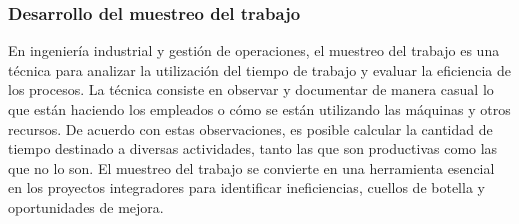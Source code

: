    \subsubsection{Desarrollo del muestreo del trabajo}
    En ingeniería industrial y gestión de operaciones, el muestreo del trabajo es una técnica para analizar la utilización del tiempo de trabajo y evaluar la eficiencia de los procesos. La técnica consiste en observar y documentar de manera casual lo que están haciendo los empleados o cómo se están utilizando las máquinas y otros recursos. De acuerdo con estas observaciones, es posible calcular la cantidad de tiempo destinado a diversas actividades, tanto las que son productivas como las que no lo son. El muestreo del trabajo se convierte en una herramienta esencial en los proyectos integradores para identificar ineficiencias, cuellos de botella y oportunidades de mejora.
